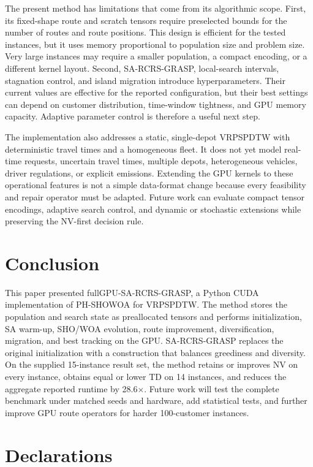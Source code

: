 \documentclass[pdflatex,sn-mathphys-num]{sn-jnl}
\begin{document}
The present method has limitations that come from its algorithmic scope. First, its fixed-shape route and scratch tensors require preselected bounds for the number of routes and route positions. This design is efficient for the tested instances, but it uses memory proportional to population size and problem size. Very large instances may require a smaller population, a compact encoding, or a different kernel layout. Second, SA-RCRS-GRASP, local-search intervals, stagnation control, and island migration introduce hyperparameters. Their current values are effective for the reported configuration, but their best settings can depend on customer distribution, time-window tightness, and GPU memory capacity. Adaptive parameter control is therefore a useful next step.

The implementation also addresses a static, single-depot VRPSPDTW with deterministic travel times and a homogeneous fleet. It does not yet model real-time requests, uncertain travel times, multiple depots, heterogeneous vehicles, driver regulations, or explicit emissions. Extending the GPU kernels to these operational features is not a simple data-format change because every feasibility and repair operator must be adapted. Future work can evaluate compact tensor encodings, adaptive search control, and dynamic or stochastic extensions while preserving the NV-first decision rule.

\section{Conclusion}\label{sec:conclusion}

This paper presented fullGPU-SA-RCRS-GRASP, a Python CUDA implementation of PH-SHOWOA for VRPSPDTW. The method stores the population and search state as preallocated tensors and performs initialization, SA warm-up, SHO/WOA evolution, route improvement, diversification, migration, and best tracking on the GPU. SA-RCRS-GRASP replaces the original initialization with a construction that balances greediness and diversity. On the supplied 15-instance result set, the method retains or improves NV on every instance, obtains equal or lower TD on 14 instances, and reduces the aggregate reported runtime by 28.6$\times$. Future work will test the complete benchmark under matched seeds and hardware, add statistical tests, and further improve GPU route operators for harder 100-customer instances.

\backmatter

\section*{Declarations}
\end{document}
